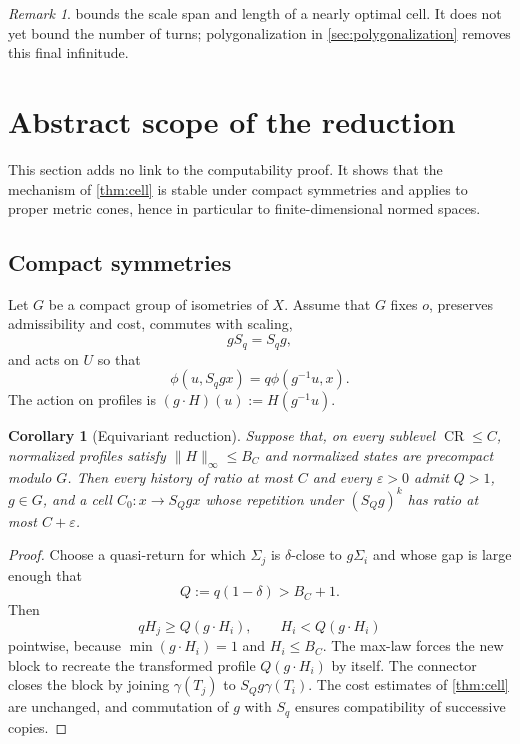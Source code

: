 \documentclass[10pt,a4paper]{article}
\newtheorem{corollary}[corollary]{Corollary}
\theoremstyle{definition}
\theoremstyle{remark}
\newtheorem{remark}[remark]{Remark}
\DeclareMathOperator{\CR}{CR}
\newcommand{\norm}[1]{\lVert #1\rVert}
\newcommand{\eps}{\varepsilon}
\begin{document}
\begin{remark}
 bounds the scale span and length of a nearly optimal cell. It does not yet bound the number of turns; polygonalization in \cref{sec:polygonalization} removes this final infinitude.
\end{remark}

\section{Abstract scope of the reduction}
\label{sec:abstract-scope}
This section adds no link to the computability proof. It shows that the mechanism of \cref{thm:cell} is stable under compact symmetries and applies to proper metric cones, hence in particular to finite-dimensional normed spaces.

\subsection{Compact symmetries}
Let $G$ be a compact group of isometries of $X$. Assume that $G$ fixes $o$, preserves admissibility and cost, commutes with scaling,
\[
gS_q=S_qg,
\]
and acts on $U$ so that
\begin{equation}
\phi(u,S_qgx)=q\phi(g^{-1}u,x).
\label{eq:equivariant-service}
\end{equation}
The action on profiles is $(g\cdot H)(u):=H(g^{-1}u)$.

\begin{corollary}[Equivariant reduction]
\label{cor:equivariant}
Suppose that, on every sublevel $\CR\le C$, normalized profiles satisfy $\norm{H}_\infty\le B_C$ and normalized states are precompact modulo $G$. Then every history of ratio at most $C$ and every $\eps>0$ admit $Q>1$, $g\in G$, and a cell $C_0:x\to S_Qgx$ whose repetition under $(S_Qg)^k$ has ratio at most $C+\eps$.
\end{corollary}

\begin{proof}
Choose a quasi-return for which $\Sigma_j$ is $\delta$-close to $g\Sigma_i$ and whose gap is large enough that
\[
Q:=q(1-\delta)>B_C+1.
\]
Then
\[
qH_j\ge Q(g\cdot H_i),
\qquad
H_i<Q(g\cdot H_i)
\]
pointwise, because $\min(g\cdot H_i)=1$ and $H_i\le B_C$. The max-law forces the new block to recreate the transformed profile $Q(g\cdot H_i)$ by itself. The connector closes the block by joining $\gamma(T_j)$ to $S_Qg\gamma(T_i)$. The cost estimates of \cref{thm:cell} are unchanged, and commutation of $g$ with $S_q$ ensures compatibility of successive copies.
\end{proof}
\end{document}
